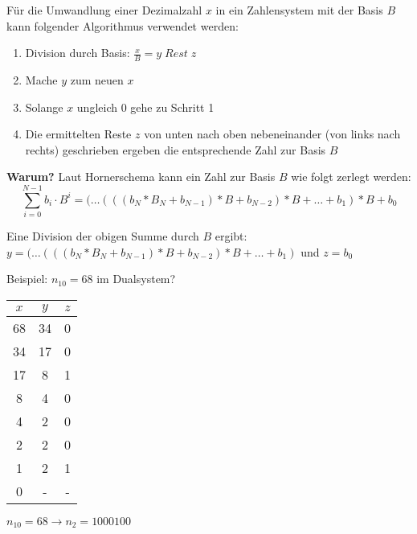 \begin{bsslide}[\textbufferB]
  F\"ur die Umwandlung einer Dezimalzahl $x$ in ein Zahlensystem mit der Basis $B$ kann folgender Algorithmus verwendet werden:
  \begin{enumerate}
  \item Division durch Basis: $\frac{x}{B} = y\;Rest\;z$
  \item Mache $y$ zum neuen $x$
  \item Solange $x$ ungleich 0 gehe zu Schritt 1
  \item Die ermittelten Reste $z$ von unten nach oben nebeneinander (von links nach rechts) geschrieben ergeben die entsprechende Zahl zur Basis $B$
  \end{enumerate}
  \textbf{Warum?}
  Laut Hornerschema kann ein Zahl zur Basis $B$ wie folgt zerlegt werden:
  \[
  \sum_{i=0}^{N-1}b_i\cdot B ^i = (\ldots(((b_N*B_N+b_{N-1})*B+b_{N-2})*B+\ldots+b_1)*B+b_0
  \]

  Eine Division der obigen Summe durch $B$ ergibt:\\
  $
  y = (\ldots(((b_N*B_N+b_{N-1})*B+b_{N-2})*B+\ldots+b_1)
  $
  und 
  $
  z = b_0
  $
\end{bsslide}
\begin{bsslide}[\textbufferB]
  Beispiel: $n_{10}=68$ im Dualsystem?
  \begin{center}
    \begin{tabular}{ccc}
      \textbf{$x$}   &   \textbf{$y$}     & \textbf{$z$}  \\
      \hline
      68  &     34 &  0       \\
      34  &     17 & 0       \\
      17  &     8   & 1       \\
      8  &     4   & 0       \\
      4  &     2   & 0       \\
      2 &      2  & 0\\
      1 &      2  & 1\\
      0 &      -  & -\\
      \hline
    \end{tabular}
  \end{center}
  $n_{10}=68\rightarrow n_2=1000100$ 
\end{bsslide}

